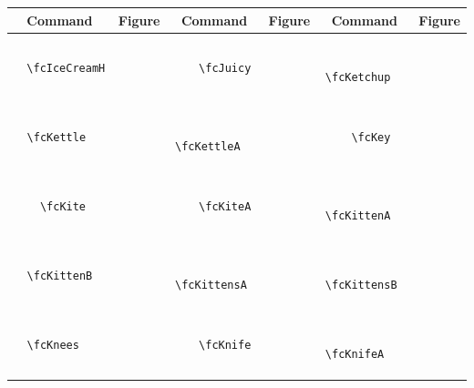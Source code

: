 \documentclass[x11names]{article}
\begin{document}
\begin{table}[H]\centering\begin{tabular}{|c|c|c|c|c|c|}\hline{\bf Command} & {\bf Figure} & {\bf Command} & {\bf Figure} & {\bf Command} & {\bf Figure}\\	\hline	&\multirow{5}{*}{	\fcIceCreamH	[scale=0.16]} & &\multirow{5}{*}{	\fcJuicy	[scale=0.16]} & &\multirow{5}{*}{	\fcKetchup	[scale=0.16]}\\	& & & & & \\	& & & & & \\	\verb|	\fcIceCreamH	| & & \verb|	\fcJuicy	| & & \verb|	\fcKetchup	| & \\	& & & & & \\	& & & & & \\	& & & & & \\	\hline									
		&\multirow{5}{*}{	\fcKettle	[scale=0.16]} & &\multirow{5}{*}{	\fcKettleA	[scale=0.16]} & &\multirow{5}{*}{	\fcKey	[scale=0.16]}\\	& & & & & \\	& & & & & \\	\verb|	\fcKettle	| & & \verb|	\fcKettleA	| & & \verb|	\fcKey	| & \\	& & & & & \\	& & & & & \\	& & & & & \\	\hline									
		&\multirow{5}{*}{	\fcKite	[scale=0.64]} & &\multirow{5}{*}{	\fcKiteA	[scale=0.16]} & &\multirow{5}{*}{	\fcKittenA	[scale=0.16]}\\	& & & & & \\	& & & & & \\	\verb|	\fcKite	| & & \verb|	\fcKiteA	| & & \verb|	\fcKittenA	| & \\	& & & & & \\	& & & & & \\	& & & & & \\	\hline									
		&\multirow{5}{*}{	\fcKittenB	[scale=0.16]} & &\multirow{5}{*}{	\fcKittensA	[scale=0.16]} & &\multirow{5}{*}{	\fcKittensB	[scale=0.16]}\\	& & & & & \\	& & & & & \\	\verb|	\fcKittenB	| & & \verb|	\fcKittensA	| & & \verb|	\fcKittensB	| & \\	& & & & & \\	& & & & & \\	& & & & & \\	\hline									
		&\multirow{5}{*}{	\fcKnees	[scale=0.16]} & &\multirow{5}{*}{	\fcKnife	[scale=0.16]} & &\multirow{5}{*}{	\fcKnifeA	[scale=0.16]}\\	& & & & & \\	& & & & & \\	\verb|	\fcKnees	| & & \verb|	\fcKnife	| & & \verb|	\fcKnifeA	| & \\	& & & & & \\	& & & & & \\	& & & & & \\	\hline									

\end{tabular}
\end{table}
\end{document}
